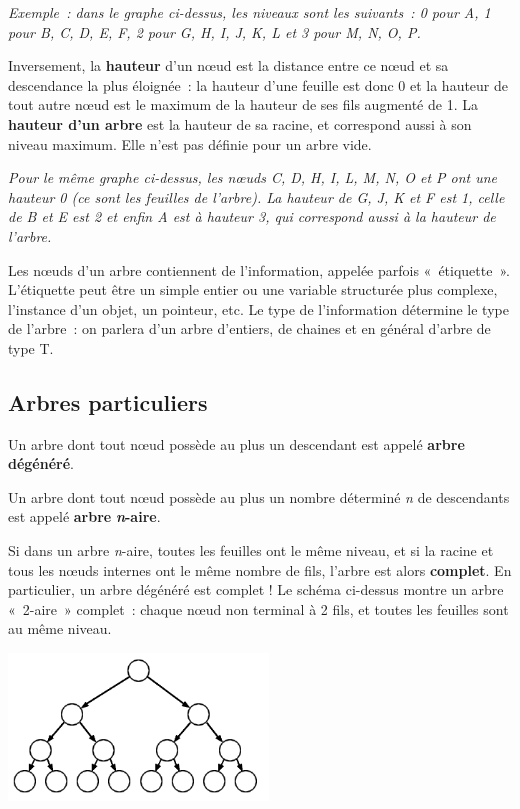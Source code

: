 		{\itshape	
		Exemple~: dans le graphe ci-dessus, les niveaux sont les suivants~: 
		0 pour A, 1 pour B, C, D, E, F, 2 pour G, H, I, J, K, L 
		et 3 pour M, N, O, P.}

		Inversement, la \textbf{hauteur} d'un n{\oe}ud est la distance entre 
		ce n{\oe}ud et sa descendance la plus éloignée~: la hauteur d'une 
		feuille est donc 0 et la hauteur de tout autre n{\oe}ud est le maximum 
		de la hauteur de ses fils augmenté de 1. La \textbf{hauteur d'un arbre} 
		est la hauteur de sa racine, et correspond aussi à son niveau maximum. 
		Elle n'est pas définie pour un arbre vide.

		{\itshape
		Pour le même graphe ci-dessus, les n{\oe}uds C, D, H, I, L, M, N, O et P 
		ont une hauteur 0 (ce sont les feuilles de l'arbre). 
		La hauteur de G, J, K et F est 1, celle de B et E est 2 
		et enfin A est à hauteur 3, qui correspond aussi à la hauteur de l'arbre.}

		Les n{\oe}uds d'un arbre contiennent de l'information, 
		appelée parfois «~étiquette~». L'étiquette peut être un simple
		entier ou une variable structurée plus complexe, l'instance 
		d'un objet, un pointeur, etc. Le type de l'information
		détermine le type de l'arbre~: on parlera d'un arbre 
		d'entiers, de chaines et en général d'arbre de type T.
	
	\subsection{Arbres particuliers}
	
		Un arbre dont tout n{\oe}ud possède au plus un descendant 
		est appelé \textbf{arbre dégénéré}.

		Un arbre dont tout n{\oe}ud possède au plus un nombre 
		déterminé \textit{n} de descendants est appelé \textbf{arbre
		}\textbf{\textit{n}-aire}. 
		
		Si dans un arbre \textit{n}-aire, toutes les feuilles ont 
		le même niveau, et si la racine et tous les n{\oe}uds
		internes ont le même nombre de fils, l'arbre est alors 
		\textbf{complet}. En particulier, un arbre dégénéré est complet ! 
		Le schéma ci-dessus montre un arbre «~2-aire~» complet~: 
		chaque n{\oe}ud non terminal à 2 fils, et toutes les
		feuilles sont au même niveau.

		\begin{center}
		\includegraphics[width=6.918cm,height=3.909cm]{image/a2012Logique2eme-img031.png}
		\end{center}


